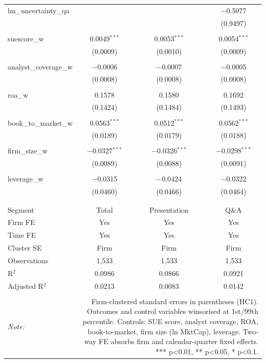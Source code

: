 \begin{table}[!htbp]
\begin{tabular}{@{\extracolsep{5pt}}lccc}
 lm\_uncertainty\_qa &  &  & $-$0.5077 \\ 
  &  &  & (0.9497) \\ 
  & & & \\ 
 suescore\_w & 0.0049$^{***}$ & 0.0053$^{***}$ & 0.0054$^{***}$ \\ 
  & (0.0009) & (0.0010) & (0.0009) \\ 
  & & & \\ 
 analyst\_coverage\_w & $-$0.0006 & $-$0.0007 & $-$0.0005 \\ 
  & (0.0008) & (0.0008) & (0.0008) \\ 
  & & & \\ 
 roa\_w & 0.1578 & 0.1580 & 0.1692 \\ 
  & (0.1424) & (0.1484) & (0.1493) \\ 
  & & & \\ 
 book\_to\_market\_w & 0.0563$^{***}$ & 0.0512$^{***}$ & 0.0562$^{***}$ \\ 
  & (0.0189) & (0.0179) & (0.0188) \\ 
  & & & \\ 
 firm\_size\_w & $-$0.0327$^{***}$ & $-$0.0326$^{***}$ & $-$0.0298$^{***}$ \\ 
  & (0.0089) & (0.0088) & (0.0091) \\ 
  & & & \\ 
 leverage\_w & $-$0.0315 & $-$0.0424 & $-$0.0322 \\ 
  & (0.0460) & (0.0466) & (0.0464) \\ 
  & & & \\ 
\hline \\[-1.8ex] 
Segment & Total & Presentation & Q\&A \\ 
Firm FE & Yes & Yes & Yes \\ 
Time FE & Yes & Yes & Yes \\ 
Cluster SE & Firm & Firm & Firm \\ 
Observations & 1,533 & 1,533 & 1,533 \\ 
R$^{2}$ & 0.0986 & 0.0866 & 0.0921 \\ 
Adjusted R$^{2}$ & 0.0213 & 0.0083 & 0.0142 \\ 
\hline 
\hline \\[-1.8ex] 
\textit{Note:}  & \multicolumn{3}{r}{Firm-clustered standard errors in parentheses (HC1). Outcomes and control variables winsorised at 1st/99th percentile. Controls: SUE score, analyst coverage, ROA, book-to-market, firm size (ln MktCap), leverage. Two-way FE absorbs firm and calendar-quarter fixed effects. *** p<0.01, ** p<0.05, * p<0.1.} \\ 
\end{tabular} 
\end{table} 
